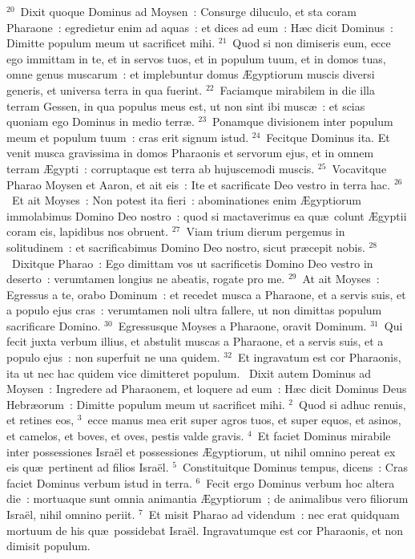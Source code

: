 ${}^{20}$~Dixit quoque Dominus ad Moysen~: Consurge diluculo, et sta coram Pharaone~: egredietur enim ad aquas~: et dices ad eum~: H\ae c dicit Dominus~: Dimitte populum meum ut sacrificet mihi.
${}^{21}$~Quod si non dimiseris eum, ecce ego immittam in te, et in servos tuos, et in populum tuum, et in domos tuas, omne genus muscarum~: et implebuntur domus \AE gyptiorum muscis diversi generis, et universa terra in qua fuerint.
${}^{22}$~Faciamque mirabilem in die illa terram Gessen, in qua populus meus est, ut non sint ibi musc\ae~: et scias quoniam ego Dominus in medio terr\ae .
${}^{23}$~Ponamque divisionem inter populum meum et populum tuum~: cras erit signum istud.
${}^{24}$~Fecitque Dominus ita. Et venit musca gravissima in domos Pharaonis et servorum ejus, et in omnem terram \AE gypti~: corruptaque est terra ab hujuscemodi muscis.
${}^{25}$~Vocavitque Pharao Moysen et Aaron, et ait eis~: Ite et sacrificate Deo vestro in terra hac.
${}^{26}$~Et ait Moyses~: Non potest ita fieri~: abominationes enim \AE gyptiorum immolabimus Domino Deo nostro~: quod si mactaverimus ea qu\ae\ colunt \AE gyptii coram eis, lapidibus nos obruent.
${}^{27}$~Viam trium dierum pergemus in solitudinem~: et sacrificabimus Domino Deo nostro, sicut pr\ae cepit nobis.
${}^{28}$~Dixitque Pharao~: Ego dimittam vos ut sacrificetis Domino Deo vestro in deserto~: verumtamen longius ne abeatis, rogate pro me.
${}^{29}$~At ait Moyses~: Egressus a te, orabo Dominum~: et recedet musca a Pharaone, et a servis suis, et a populo ejus cras~: verumtamen noli ultra fallere, ut non dimittas populum sacrificare Domino.
${}^{30}$~Egressusque Moyses a Pharaone, oravit Dominum.
${}^{31}$~Qui fecit juxta verbum illius, et abstulit muscas a Pharaone, et a servis suis, et a populo ejus~: non superfuit ne una quidem.
${}^{32}$~Et ingravatum est cor Pharaonis, ita ut nec hac quidem vice dimitteret populum.
~\lettrine[lines=10,image=true,loversize=0.05,lraise=-0.03]{D}{}ixit autem Dominus ad Moysen~: Ingredere ad Pharaonem, et loquere ad eum~: H\ae c dicit Dominus Deus Hebr\ae orum~: Dimitte populum meum ut sacrificet mihi.
${}^{2}$~Quod si adhuc renuis, et retines eos,
${}^{3}$~ecce manus mea erit super agros tuos, et super equos, et asinos, et camelos, et boves, et oves, pestis valde gravis.
${}^{4}$~Et faciet Dominus mirabile inter possessiones Isra\"el et possessiones \AE gyptiorum, ut nihil omnino pereat ex eis qu\ae\ pertinent ad filios Isra\"el.
${}^{5}$~Constituitque Dominus tempus, dicens~: Cras faciet Dominus verbum istud in terra.
${}^{6}$~Fecit ergo Dominus verbum hoc altera die~: mortuaque sunt omnia animantia \AE gyptiorum~; de animalibus vero filiorum Isra\"el, nihil omnino periit.
${}^{7}$~Et misit Pharao ad videndum~: nec erat quidquam mortuum de his qu\ae\ possidebat Isra\"el. Ingravatumque est cor Pharaonis, et non dimisit populum.



